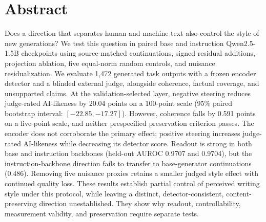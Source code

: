 \section*{Abstract}
\begingroup\small
Does a direction that separates human and machine text also control the style of new generations? We test this question in paired base and instruction Qwen2.5-1.5B checkpoints using source-matched continuations, signed residual additions, projection ablation, five equal-norm random controls, and nuisance residualization. We evaluate 1,472 generated task outputs with a frozen encoder detector and a blinded external judge, alongside coherence, factual coverage, and unsupported claims. At the validation-selected layer, negative steering reduces judge-rated AI-likeness by 20.04 points on a 100-point scale (95\% paired bootstrap interval: $[-22.85,-17.27]$). However, coherence falls by 0.591 points on a five-point scale, and neither prespecified preservation criterion passes. The encoder does not corroborate the primary effect; positive steering increases judge-rated AI-likeness while decreasing its detector score. Readout is strong in both base and instruction backbones (held-out AUROC 0.9707 and 0.9704), but the instruction-backbone direction fails to transfer to base-generator continuations (0.486). Removing five nuisance proxies retains a smaller judged style effect with continued quality loss. These results establish partial control of perceived writing style under this protocol, while leaving a distinct, detector-consistent, content-preserving direction unestablished. They show why readout, controllability, measurement validity, and preservation require separate tests.
\par\endgroup
